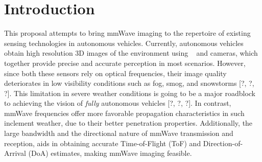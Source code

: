 \section{Introduction}



\vspace{-15mm}

This proposal attempts to bring mmWave imaging to the repertoire of existing sensing technologies in autonomous vehicles. Currently, autonomous vehicles obtain high resolution 3D images of the environment using \lidar~ and cameras, which together provide precise and accurate perception in most scenarios. 
However, since both these sensors rely on optical frequencies, their image quality deteriorates in low visibility conditions such as fog, smog, and snowstorms [?, ?, ?]. 
This limitation in severe weather conditions is going to be a major roadblock to achieving the vision of \textit{fully} autonomous vehicles [?, ?, ?].
In contrast, mmWave frequencies offer more favorable propagation characteristics in such inclement weather, due to their better penetration properties. Additionally, the large bandwidth and the directional nature of mmWave transmission and reception, aids in obtaining accurate Time-of-Flight (ToF) and Direction-of-Arrival (DoA) estimates, making mmWave imaging feasible. 


